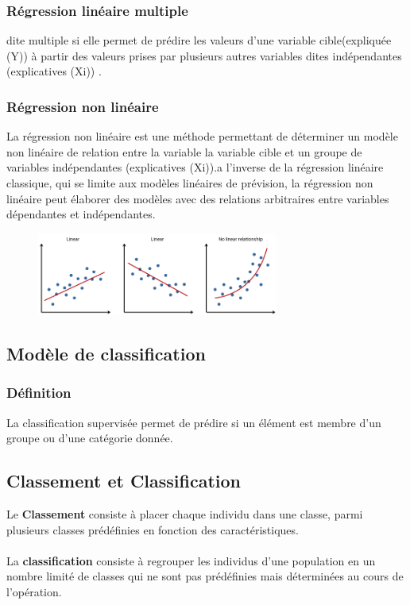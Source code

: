 \documentclass[12pt]{report}
\begin{document}
\subsubsection{Régression linéaire multiple}
dite multiple si elle permet de prédire les valeurs d’une variable cible(expliquée (Y)) à partir des valeurs prises par plusieurs autres variables dites indépendantes (explicatives (Xi)) \cite{ref11}.
\subsubsection{Régression non linéaire}
La régression non linéaire est une méthode permettant de déterminer un modèle non linéaire de relation entre la variable la variable cible et un groupe de variables indépendantes (explicatives (Xi)).a l'inverse de la régression linéaire classique, qui se limite aux modèles linéaires de prévision, la régression non linéaire peut élaborer des modèles avec des relations arbitraires entre variables dépendantes et indépendantes.
\begin{figure}[h]
\begin{center}
\includegraphics[width=300]{rg.png}
\end{center}
\caption{}
\label{}
\end{figure}




\subsection{Modèle de classification}
\subsubsection{Définition}
La classification supervisée permet de prédire si un élément est membre d’un groupe ou d’une catégorie donnée. 

\subsection{Classement et Classification }
Le \textbf{Classement} consiste à placer chaque individu dans une classe, parmi plusieurs classes prédéfinies en fonction des caractéristiques.\\\\
La \textbf{classification} consiste à regrouper les individus d'une population en un nombre limité de classes qui ne sont pas prédéfinies mais déterminées au cours de l'opération.
\end{document}

